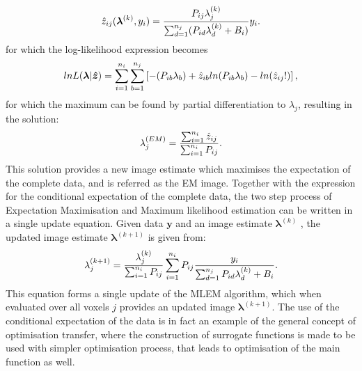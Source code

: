 \begin{equation}
\hat{z}_{ij}(\bm{\lambda}^{(k)},y_i) = 
\frac{P_{ij} \lambda_j^{(k)}}{\sum_{d=1}^{n_j} (P_{id}\lambda_d^{(k)} + B_i)}y_i\\.
\end{equation}
for which the log-likelihood expression becomes
\begin{equation}
lnL(\bm{\lambda}|\bm{\hat{z}})  =
\sum_{i=1}^{n_i} \sum_{b=1}^{n_j} \left[ -(P_{ib} \lambda_b) + \hat{z}_{ib} ln( P_{ib} \lambda_b ) - ln(\hat{z}_{ij}!) \right] \\,
\label{eqn:log_likelihood_z}
\end{equation}
for which the maximum can be found by partial differentiation to $\lambda_j$, resulting in the solution:
\begin{equation}
\lambda_j^{(EM)} = \frac{\sum_{i=1}^{n_i} \hat{z}_{ij} }{\sum_{i=1}^{n_i} P_{ij} } \\.
\label{eqn:EMupdate}
\end{equation}
This solution provides a new image estimate which maximises the expectation of the complete data, and is referred as the EM image. 
Together with the expression for the conditional expectation of the complete data, the two step process of Expectation Maximisation and  Maximum likelihood estimation can be written in a single update equation. Given data $\bm{y}$ and an image estimate $\bm{\lambda}^{(k)}$ , the updated image estimate $\bm{\lambda}^{(k+1)}$ is given from:
\begin{equation}
\lambda_j^{(k+1)} = \frac{\lambda_j^{(k)}}{\sum_{i=1}^{n_i} P_{ij}} 
\sum_{i=1}^{n_i} P_{ij} 
\frac{y_i}{\sum_{d=1}^{n_j} P_{id}\lambda_d^{(k)} + B_i } \\.
\label{eqn:MLEM}
\end{equation} 
This equation forms a single update of the MLEM algorithm, which when evaluated over all voxels $j$ provides an updated image $\bm{\lambda}^{(k+1)}$. 
The use of the conditional expectation of the data is in fact an example of the general concept of optimisation transfer, where the construction of surrogate functions is made to be used with simpler optimisation process, that leads to optimisation of the main function as well.

